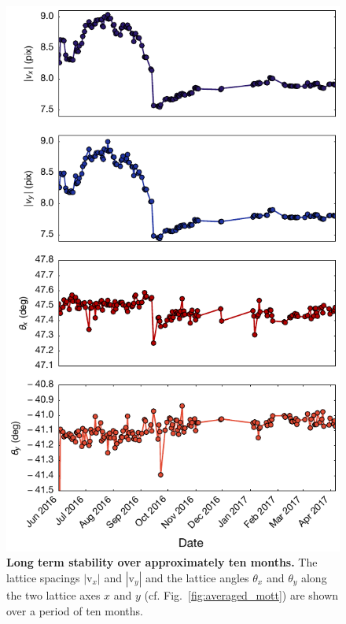 \documentclass[twocolumn,aps,pra,showpacs,preprintnumbers,bibnotes]{revtex4-1}
\begin{document}
\begin{figure}
\begin{center}
    \includegraphics[width=\columnwidth]{Figure14.pdf}
    \caption{\textbf{Long term stability over approximately ten months.} The lattice spacings $|\mathrm{v}_x|$ and $|\mathrm{v}_y|$ and the lattice angles $\theta_x$ and $\theta_y$ along the two lattice axes $x$ and $y$ (cf. Fig.~\ref{fig:averaged_mott}) are shown over a period of ten months.}\label{fig:long_term_stability}
  \end{center}
\end{figure}
\end{document}
